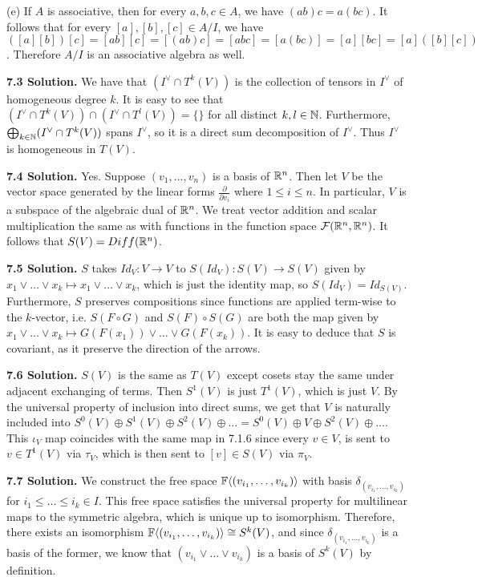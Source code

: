 (e) If $A$ is associative, then for every $a, b, c \in A$, we have $(ab)c = a(bc)$. It follows that for every $[a], [b], [c] \in A / I$, we have $([a][b])[c] = [ab][c] = [(ab)c] = [abc] = [a(bc)] = [a][bc] = [a]([b][c])$. Therefore $A / I$ is an associative algebra as well.

\textbf{7.3 Solution.} We have that $(I^{\vee} \cap T^k(V))$ is the collection of tensors in $I^{\vee}$ of homogeneous degree $k$. It is easy to see that $(I^{\vee} \cap T^k(V)) \cap (I^{\vee} \cap T^l(V)) = \{\}$ for all distinct $k, l \in \mathbb{N}$. Furthermore, $\bigoplus_{k \in \mathbb{N}}(I^{\vee} \cap T^k(V))$ spans $I^{\vee}$, so it is a direct sum decomposition of $I^{\vee}$. Thus $I^{\vee}$ is homogeneous in $T(V)$.

\textbf{7.4 Solution.} Yes. Suppose $(v_1, \dots, v_n)$ is a basis of $\mathbb{R}^n$. Then let $V$ be the vector space generated by the linear forms $\frac{\partial}{\partial v_i}$ where $1 \leq i \leq n$. In particular, $V$ is a subspace of the algebraic dual of $\mathbb{R}^n$. We treat vector addition and scalar multiplication the same as with functions in the function space $\mathcal{F}(\mathbb{R}^n, \mathbb{R}^n)$. It follows that $S(V) = Diff(\mathbb{R}^n)$.

\textbf{7.5 Solution.} $S$ takes $Id_V: V \to V$ to $S(Id_V): S(V) \to S(V)$ given by $x_1 \vee \dots \vee x_k \mapsto x_1 \vee \dots \vee x_k$, which is just the identity map, so $S(Id_V) = Id_{S(V)}$. Furthermore, $S$ preserves compositions since functions are applied term-wise to the $k$-vector, i.e. $S(F \circ G)$ and $S(F) \circ S(G)$ are both the map given by $x_1 \vee \dots \vee x_k \mapsto G(F(x_1)) \vee \dots \vee G(F(x_k))$. It is easy to deduce that $S$ is covariant, as it preserve the direction of the arrows.

\textbf{7.6 Solution.} $S(V)$ is the same as $T(V)$ except cosets stay the same under adjacent exchanging of terms. Then $S^1(V)$ is just $T^1(V)$, which is just $V$. By the universal property of inclusion into direct sums, we get that $V$ is naturally included into $S^0(V) \oplus S^1(V) \oplus S^2(V) \oplus \dots = S^0(V) \oplus V \oplus S^2(V) \oplus \dots$. This $\iota_V$ map coincides with the same map in 7.1.6 since every $v \in V$, is sent to $v \in T^1(V)$ via $\tau_V$, which is then sent to $[v] \in S(V)$ via $\pi_V$.

\textbf{7.7 Solution.} We construct the free space $\mathbb{F}\langle (v_{i_1}, \dots, v_{i_k}) \rangle$ with basis $\delta_{(v_{i_1}, \dots, v_{i_k})}$ for $i_1 \leq \dots \leq i_k \in I$. This free space satisfies the universal property for multilinear maps to the symmetric algebra, which is unique up to isomorphism. Therefore, there exists an isomorphism $\mathbb{F}\langle (v_{i_1}, \dots, v_{i_k}) \rangle \cong S^k(V)$, and since $\delta_{(v_{i_1}, \dots, v_{i_k})}$ is a basis of the former, we know that $(v_{i_1} \vee \dots \vee v_{i_k})$ is a basis of $S^k(V)$ by definition.

